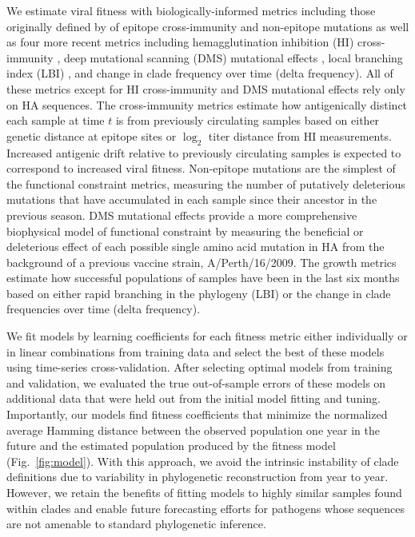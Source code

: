 We estimate viral fitness with biologically-informed metrics including those originally defined by \cite{Luksza:2014hj} of epitope cross-immunity and non-epitope mutations as well as four more recent metrics including hemagglutination inhibition (HI) cross-immunity \cite{Neher:2016hy}, deep mutational scanning (DMS) mutational effects \cite{Lee2018}, local branching index (LBI) \cite{Neher:2014eu}, and change in clade frequency over time (delta frequency).
All of these metrics except for HI cross-immunity and DMS mutational effects rely only on HA sequences.
The cross-immunity metrics estimate how antigenically distinct each sample at time $t$ is from previously circulating samples based on either genetic distance at epitope sites or $\log_{2}$ titer distance from HI measurements.
Increased antigenic drift relative to previously circulating samples is expected to correspond to increased viral fitness.
Non-epitope mutations are the simplest of the functional constraint metrics, measuring the number of putatively deleterious mutations that have accumulated in each sample since their ancestor in the previous season.
DMS mutational effects provide a more comprehensive biophysical model of functional constraint by measuring the beneficial or deleterious effect of each possible single amino acid mutation in HA from the background of a previous vaccine strain, A/Perth/16/2009.
The growth metrics estimate how successful populations of samples have been in the last six months based on either rapid branching in the phylogeny (LBI) or the change in clade frequencies over time (delta frequency).

We fit models by learning coefficients for each fitness metric either individually or in linear combinations from training data and select the best of these models using time-series cross-validation.
After selecting optimal models from training and validation, we evaluated the true out-of-sample errors of these models on additional data that were held out from the initial model fitting and tuning.
Importantly, our models find fitness coefficients that minimize the normalized average Hamming distance between the observed population one year in the future and the estimated population produced by the fitness model (Fig.~\ref{fig:model}).
With this approach, we avoid the intrinsic instability of clade definitions due to variability in phylogenetic reconstruction from year to year.
However, we retain the benefits of fitting models to highly similar samples found within clades and enable future forecasting efforts for pathogens whose sequences are not amenable to standard phylogenetic inference.

